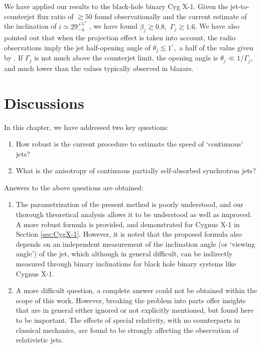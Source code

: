 We have applied our results to the black-hole binary Cyg X-1. Given the jet-to-counterjet flux ratio of $ \gtrsim 50 $ found observationally \citealt{Stirling_et_al.-2001-MNRAS} and the current estimate of the inclination of $ i \simeq {29^{+5}_{-4}}^{\circ}$ \citealt{Ziolkowski-2014-MNRAS}, we have found $ \beta_j \gtrsim 0.8 , $ $ \Gamma_j \gtrsim 1.6 . $ We have also pointed out that when the projection effect is taken into account, the radio observations imply the jet half-opening angle of $ \theta_j \lesssim 1^{\circ} , $ a half of the value given by \citealt{Stirling_et_al.-2001-MNRAS}. If $ \Gamma_j $ is not much above the counterjet limit, the opening angle is $ \theta_j \ll 1/\Gamma_j , $ and much lower than the values typically observed in blazars.



\section{Discussions} \label{sec:discussions}

In this chapter, we have addressed two key questions:
\begin{enumerate}
\item How robust is the current procedure to estimate the speed of `continuous' jets?
\item What is the anisotropy of continuous partially self-absorbed synchrotron jets?
\end{enumerate}

Answers to the above questions are obtained:
\begin{enumerate}

\item The parametrization of the present method is poorly understood, and our thorough theoretical analysis allows it to be understood as well as improved. A more robust formula is provided, and demonstrated for Cygnus X-1 in Section \ref{sec:CygX-1}. However, it is noted that the proposed formula also depends on an independent measurement of the inclination angle (or `viewing angle') of the jet, which although in general difficult, can be indirectly measured through binary inclinations for black hole binary systems like Cygnus X-1.

\item A more difficult question, a complete answer could not be obtained within the scope of this work. However, breaking the problem into parts offer insights that are in general either ignored or not explicitly mentioned, but found here to be important. The effects of special relativity, with no counterparts in classical mechanics, are found to be strongly affecting the observation of relativistic jets.

\end{enumerate}

